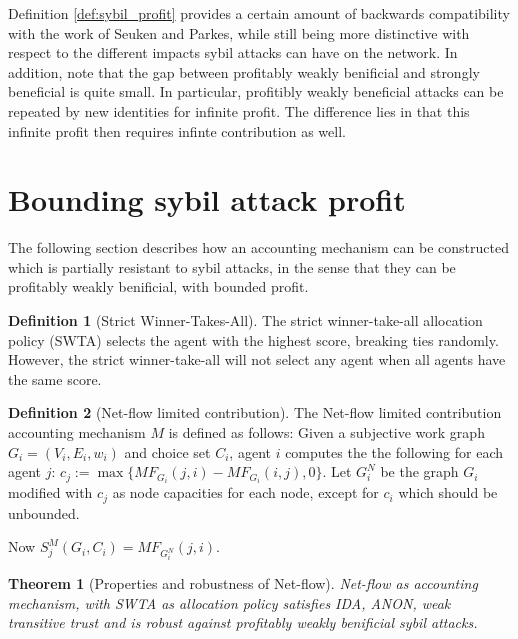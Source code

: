 \documentclass[a4paper,11pt]{book}
\newtheorem{theorem}{Theorem}
\theoremstyle{definition}
\newtheorem{definition}{Definition}
\begin{document}
Definition \ref{def:sybil_profit} provides a certain amount of backwards compatibility with the work
of Seuken and Parkes, while still being more distinctive with respect to the different impacts
sybil attacks can have on the network. In addition, note that the gap between profitably weakly
benificial and strongly beneficial is quite small. In particular, profitibly weakly beneficial
attacks can be repeated by new identities for infinite profit. The difference lies in that
this infinite profit then requires infinte contribution as well.

\section{Bounding sybil attack profit}

The following section describes how an accounting mechanism can be constructed which is partially
resistant to sybil attacks, in the sense that they can be profitably weakly benificial, with bounded
profit.

\begin{definition}[Strict Winner-Takes-All]
   The strict winner-take-all allocation policy (SWTA) selects the agent with the highest score,
   breaking ties randomly. However, the strict winner-take-all will not select any agent
   when all agents have the same score.
\end{definition}


\begin{definition}[Net-flow limited contribution]
    The Net-flow limited contribution accounting mechanism $M$ is defined as follows:
    Given a subjective work graph $G_i = (V_i, E_i, w_i)$ and choice set $C_i$, agent
    $i$ computes the the following for each agent $j$: 
    $c_j := \max\{MF_{G_i}(j,i) - MF_{G_i}(i,j), 0\}$.
    Let $G_i^N$ be the graph $G_i$ modified with $c_j$ as node capacities for each node,
    except for $c_i$ which should be unbounded.

    Now $S^M_j(G_i, C_i) = MF_{G_i^N}(j, i)$.
\end{definition}

\begin{theorem}[Properties and robustness of Net-flow]
    Net-flow as accounting mechanism, with SWTA as allocation policy
    satisfies IDA, ANON, weak transitive trust and is robust against
    profitably weakly benificial sybil attacks.

    \label{thm:prop-rob-net-flow}
\end{theorem}
\end{document}
